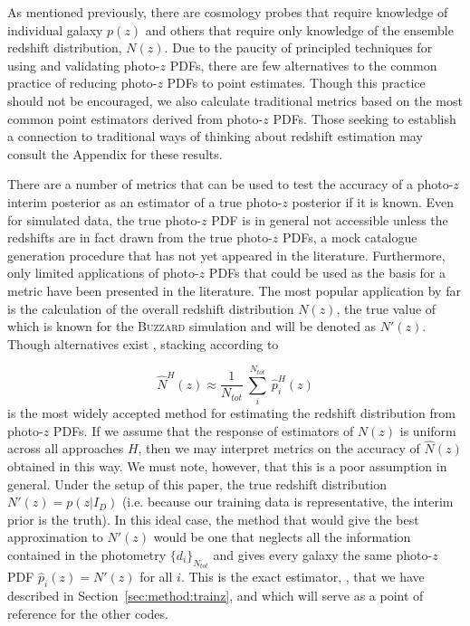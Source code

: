 As mentioned previously, there are cosmology probes that require knowledge of individual galaxy $p(z)$ and others that require only knowledge of the ensemble redshift distribution, $N(z)$.
Due to the paucity of principled techniques for using and validating photo-$z$ PDFs, there are few alternatives to the common practice of reducing photo-$z$ PDFs to point estimates.
Though this practice should not be encouraged, we also calculate traditional metrics based on the most common point estimators derived from photo-$z$ PDFs.
Those seeking to establish a connection to traditional ways of thinking about redshift estimation may consult the Appendix for these results.

There are a number of metrics that can be used to test the accuracy of a photo-$z$ interim posterior as an estimator of a true photo-$z$ posterior if it is known.
Even for simulated data, the true photo-$z$ PDF is in general not accessible unless the redshifts are in fact drawn from the true photo-$z$ PDFs, a mock catalogue generation procedure that has not yet appeared in the literature.
Furthermore, only limited applications of photo-$z$ PDFs that could be used as the basis for a metric have been presented in the literature.
The most popular application by far is the calculation of the overall redshift distribution $N(z)$, the true value of which is known for the \textsc{Buzzard} simulation and will be denoted as $N'(z)$.
Though alternatives exist \citep{Malz:chippr}, stacking according to

\begin{equation} \label{eq:stacked}
\hat{N}^{H}(z) \approx \frac{1}{N_{tot}}\ \sum_{i}^{N_{tot}}\ \hat{p}^{H}_{i}(z)
\end{equation}
is the most widely accepted method for estimating the redshift distribution from photo-$z$ PDFs.
If we assume that the response of estimators of $N(z)$ is uniform across all approaches $H$, then we may interpret metrics on the accuracy of $\hat{N}(z)$ obtained in this way.
We must note, however, that this is a poor assumption in general.
Under the setup of this paper, the true redshift distribution $N'(z) = p(z | I_{D})$ (i.e. because our training data is representative, the interim prior is the truth).  In this ideal case, the method that would give the best approximation to $N'(z)$ would be one that neglects all the information contained in the photometry $\{d_{i}\}_{N_{tot}}$ and gives every galaxy the same photo-$z$ PDF $\hat{p}_{i}(z) = N'(z)$ for all $i$.  This is the exact estimator, \trainz, that we have described in Section~\ref{sec:method:trainz}, and which will serve as a point of reference for the other codes.

